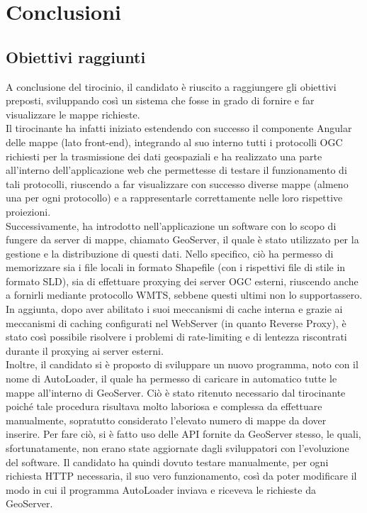 \chapter{Conclusioni}
\label{cap:chapter8}

\section{Obiettivi raggiunti}

A conclusione del tirocinio, il candidato è riuscito a raggiungere gli obiettivi preposti, sviluppando così un sistema che fosse in grado di fornire e far visualizzare le mappe richieste.
\\Il tirocinante ha infatti iniziato estendendo con successo il componente Angular delle mappe (lato front-end), integrando al suo interno tutti i protocolli OGC richiesti per la trasmissione dei dati geospaziali e ha realizzato una parte all'interno dell'applicazione web che permettesse di testare il funzionamento di tali protocolli, riuscendo a far visualizzare con successo diverse mappe (almeno una per ogni protocollo) e a rappresentarle correttamente nelle loro rispettive proiezioni.
\\Successivamente, ha introdotto nell'applicazione un software con lo scopo di fungere da server di mappe, chiamato GeoServer, il quale è stato utilizzato per la gestione e la distribuzione di questi dati. Nello specifico, ciò ha permesso di memorizzare sia i file locali in formato Shapefile (con i rispettivi file di stile in formato SLD), sia di effettuare proxying dei server OGC esterni, riuscendo anche a fornirli mediante protocollo WMTS, sebbene questi ultimi non lo supportassero. In aggiunta, dopo aver abilitato i suoi meccanismi di cache interna e grazie ai meccanismi di caching configurati nel WebServer (in quanto Reverse Proxy), è stato così possibile risolvere i problemi di rate-limiting e di lentezza riscontrati durante il proxying ai server esterni. 
\\Inoltre, il candidato si è proposto di sviluppare un nuovo programma, noto con il nome di AutoLoader, il quale ha permesso di caricare in automatico tutte le mappe all'interno di GeoServer. Ciò è stato ritenuto necessario dal tirocinante poiché tale procedura risultava molto laboriosa e complessa da effettuare manualmente, sopratutto considerato l'elevato numero di mappe da dover inserire. Per fare ciò, si è fatto uso delle API fornite da GeoServer stesso, le quali, sfortunatamente, non erano state aggiornate dagli sviluppatori con l'evoluzione del software. Il candidato ha quindi dovuto testare manualmente, per ogni richiesta HTTP necessaria, il suo vero funzionamento, così da poter modificare il modo in cui il programma AutoLoader inviava e riceveva le richieste da GeoServer.

